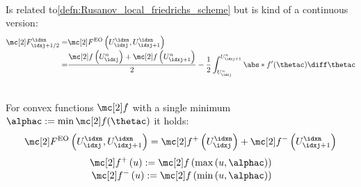 \begin{defnbox}\nospacing
    \begin{defn}\label{defn:enquist_osher_scheme}\leavevmode\\
        Is related to\cref{defn:Rusanov_local_friedrichs_scheme} but is kind of a continuous version:
        \begin{align}
          \Flux_{\idxj+1/2}^{\idxn}=&\Flux^{\text{EO}}\left(U^{\idxn}_{\idxj},U^{\idxn}_{\idxj+1}\right)\\[-1\jot]
                                   =&\frac{\flux\left(U_{\idxj}^{n}\right)+\flux \left(U_{\idxj+1}^{n}\right)}{2} -\frac{1}{2}\int_{U_{\idxj}^{n}}^{U_{\idxj+1}^{n}}\abs*{f'(\thetac)}\diff\thetac\nonumber
        \end{align}
    \end{defn}
\end{defnbox}
\begin{corbox}\nospacing
    \begin{cor}\label{cor:engquist_oshner_for_convex_functions}\leavevmode\\
        For convex functions $\flux$ with a single minimum $\alphac:=\min\flux(\thetac)$ it holds:
        \begin{align}
          \Flux^{\text{EO}}\left(U^{\idxn}_{\idxj},U^{\idxn}_{\idxj+1}\right)=\flux^{+}\left(U_{\idxj}^{\idxn}\right)+\flux^{-}\left(U_{\idxj+1}^{\idxn}\right)
        \end{align}
        \begin{align*}
            \flux^{+}\left(u\right):=\flux \left(\max \left(u,\alphac\right) \right)\\[-1\jot]
            \flux^{-}\left(u\right):=\flux \left(\min \left(u,\alphac\right) \right)
        \end{align*}
    \end{cor}
\end{corbox}
